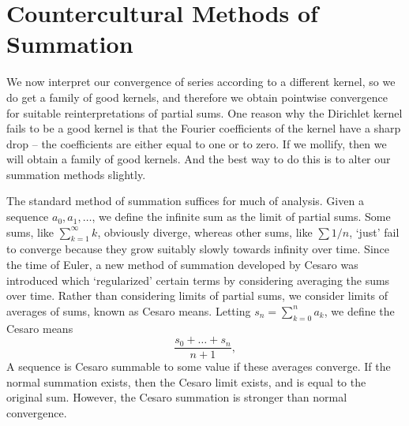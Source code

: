 
\section{Countercultural Methods of Summation}

We now interpret our convergence of series according to a different kernel, so we do get a family of good kernels, and therefore we obtain pointwise convergence for suitable reinterpretations of partial sums. One reason why the Dirichlet kernel fails to be a good kernel is that the Fourier coefficients of the kernel have a sharp drop -- the coefficients are either equal to one or to zero. If we mollify, then we will obtain a family of good kernels. And the best way to do this is to alter our summation methods slightly.

The standard method of summation suffices for much of analysis. Given a sequence $a_0, a_1, \dots$, we define the infinite sum as the limit of partial sums. Some sums, like $\sum_{k = 1}^\infty k$, obviously diverge, whereas other sums, like $\sum 1/n$, `just' fail to converge because they grow suitably slowly towards infinity over time. Since the time of Euler, a new method of summation developed by Cesaro was introduced which `regularized' certain terms by considering averaging the sums over time. Rather than considering limits of partial sums, we consider limits of averages of sums, known as Cesaro means. Letting $s_n = \sum_{k = 0}^n a_k$, we define the Cesaro means
%
\[ \frac{s_0 + \dots + s_n}{n+1}, \]
%
A sequence is Cesaro summable to some value if these averages converge. If the normal summation exists, then the Cesaro limit exists, and is equal to the original sum. However, the Cesaro summation is stronger than normal convergence.

